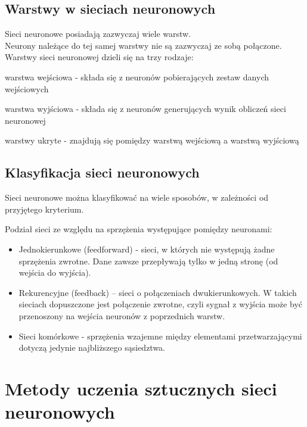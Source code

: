 \subsection{Warstwy w sieciach neuronowych}
Sieci neuronowe posiadają zazwyczaj wiele warstw. \\
Neurony należące do tej samej warstwy nie są zazwyczaj ze sobą połączone.
Warstwy sieci neuronowej dzieli się na trzy rodzaje:
\begin{itemize*}
\item warstwa wejściowa - składa się z neuronów pobierających zestaw danych
wejściowych
\item warstwa wyjściowa - składa się z neuronów generujących wynik obliczeń
sieci neuronowej
\item warstwy ukryte - znajdują się pomiędzy warstwą wejściową a warstwą wyjściową
\end{itemize*}
\newpage

\subsection{Klasyfikacja sieci neuronowych}
Sieci neuronowe można klasyfikować na wiele sposobów, w zależności od przyjętego kryterium.
\begin{enumerate*}
\item Podział sieci ze względu na sprzężenia występujące pomiędzy neuronami:
\begin{itemize}
\item Jednokierunkowe (feedforward) - sieci, w których nie występują żadne
sprzężenia zwrotne. Dane zawsze przepływają tylko w jedną stronę (od
wejścia do wyjścia).
\item Rekurencyjne (feedback) – sieci o połączeniach dwukierunkowych.
W takich sieciach dopuszczone jest połączenie zwrotne, czyli sygnał z
wyjścia może być przenoszony na wejścia neuronów z poprzednich warstw.
\item Sieci komórkowe - sprzężenia wzajemne między elementami
przetwarzającymi dotyczą jedynie najbliższego sąsiedztwa.
\end{itemize}
\end{enumerate*}

\section{Metody uczenia sztucznych sieci neuronowych}
